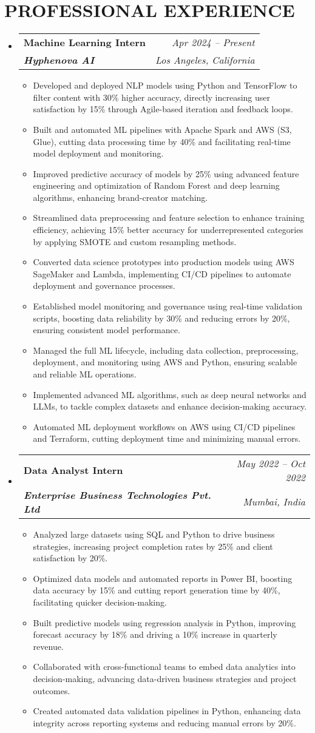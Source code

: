 \documentclass[letterpaper,11pt]{article}
\makeatletter
\newcommand{\resumeItem}[1]{
  \item\small{
    {#1 \vspace{-4pt}}
  }
}
\newcommand{\resumeSubheading}[4]{
  \vspace{-2pt}\item
    \begin{tabular*}{0.97\textwidth}[t]{l@{\extracolsep{\fill}}r}
      \textbf{#1} & #2 \\
      \textit{\small#3} & \textit{\small #4} \\
    \end{tabular*}\vspace{-7pt}
}
\newcommand{\resumeSubHeadingListStart}{\begin{itemize}[leftmargin=0.15in, label={}]}
\newcommand{\resumeSubHeadingListEnd}{\end{itemize}}
\newcommand{\resumeItemListStart}{\begin{itemize}}
\newcommand{\resumeItemListEnd}{\end{itemize}\vspace{-5pt}}
\makeatother
\begin{document}
\section{\textbf{PROFESSIONAL EXPERIENCE}}
\vspace{-1pt}
  \resumeSubHeadingListStart
    \resumeSubheading
      {Machine Learning Intern}{\textit{Apr 2024 -- Present}}
      {\textbf{Hyphenova AI}}{Los Angeles, California}
      \resumeItemListStart
        \resumeItem{Developed and deployed NLP models using Python and TensorFlow to filter content with 30\% higher accuracy, directly increasing user satisfaction by 15\% through Agile-based iteration and feedback loops.}
        \resumeItem{Built and automated ML pipelines with Apache Spark and AWS (S3, Glue), cutting data processing time by 40\% and facilitating real-time model deployment and monitoring.}
        \resumeItem{Improved predictive accuracy of models by 25\% using advanced feature engineering and optimization of Random Forest and deep learning algorithms, enhancing brand-creator matching.}
        \resumeItem{Streamlined data preprocessing and feature selection to enhance training efficiency, achieving 15\% better accuracy for underrepresented categories by applying SMOTE and custom resampling methods.}
        \resumeItem{Converted data science prototypes into production models using AWS SageMaker and Lambda, implementing CI/CD pipelines to automate deployment and governance processes.}
        \resumeItem{Established model monitoring and governance using real-time validation scripts, boosting data reliability by 30\% and reducing errors by 20\%, ensuring consistent model performance.}
        \resumeItem{Managed the full ML lifecycle, including data collection, preprocessing, deployment, and monitoring using AWS and Python, ensuring scalable and reliable ML operations.}
        \resumeItem{Implemented advanced ML algorithms, such as deep neural networks and LLMs, to tackle complex datasets and enhance decision-making accuracy.}
        \resumeItem{Automated ML deployment workflows on AWS using CI/CD pipelines and Terraform, cutting deployment time and minimizing manual errors.}
      \resumeItemListEnd

    \resumeSubheading
      {Data Analyst Intern}{\textit{May 2022 -- Oct 2022}}
      {\textbf{Enterprise Business Technologies Pvt. Ltd}}{Mumbai, India}
      \resumeItemListStart
        \resumeItem{Analyzed large datasets using SQL and Python to drive business strategies, increasing project completion rates by 25\% and client satisfaction by 20\%.}
        \resumeItem{Optimized data models and automated reports in Power BI, boosting data accuracy by 15\% and cutting report generation time by 40\%, facilitating quicker decision-making.}
        \resumeItem{Built predictive models using regression analysis in Python, improving forecast accuracy by 18\% and driving a 10\% increase in quarterly revenue.}
        \resumeItem{Collaborated with cross-functional teams to embed data analytics into decision-making, advancing data-driven business strategies and project outcomes.}
        \resumeItem{Created automated data validation pipelines in Python, enhancing data integrity across reporting systems and reducing manual errors by 20\%.}
      \resumeItemListEnd
  \resumeSubHeadingListEnd
\end{document}
